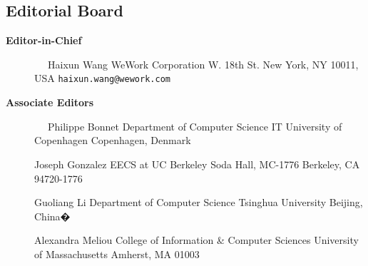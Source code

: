 \documentclass[10pt,twocolumn]{article}
\begin{document}
\pagestyle{empty}

\subsection*{Editorial Board}

\begin{description}
\item[{\bf Editor-in-Chief}]
\verb-  -                      \newline
Haixun Wang                 \newline
WeWork Corporation              W. 18th St.     \newline
New York, NY 10011, USA         \newline
\verb+haixun.wang@wework.com+     
\vspace{-.2cm}

\item[{\bf Associate Editors}] 
\verb-  -                     \newline
Philippe Bonnet \newline
Department of Computer Science \newline
IT University of Copenhagen  Copenhagen, Denmark \newline

\vspace{-.4cm}

Joseph Gonzalez \newline
EECS at UC Berkeley Soda Hall, MC-1776 \newline
Berkeley, CA 94720-1776 \newline

\vspace{-.4cm}

Guoliang Li\newline
Department of Computer Science \newline 
Tsinghua University\newline
Beijing, China�\newline
\vspace{-.2cm}

Alexandra Meliou\newline
College of Information \& Computer Sciences \newline 
University of  Massachusetts \newline
Amherst, MA 01003 \newline
\vspace{-.2cm}



\end{description}
\end{document}
